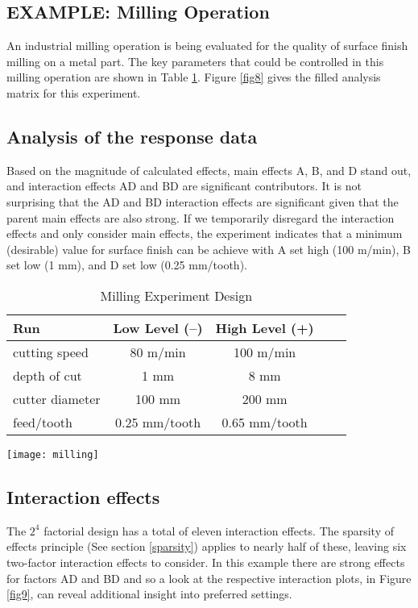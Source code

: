\subsection{EXAMPLE: Milling Operation}
An industrial milling operation is being evaluated for the quality of surface finish milling on a metal part.  The key parameters that could be controlled in this milling operation are shown in Table \ref{tab8}. Figure \ref{fig8} gives the filled analysis matrix for this experiment.

\subsection{Analysis of the response data}
Based on the magnitude of calculated effects, main effects A, B, and D stand out, and interaction effects AD and BD are significant contributors.  It is not surprising that the AD and BD interaction effects are significant given that the parent main effects are also strong. If we temporarily disregard the interaction effects and only consider main effects, the experiment indicates that a minimum (desirable) value for surface finish can be achieve with A set high (100 m/min), B set low (1 mm), and D set low (0.25 mm/tooth).\label{maineff}

\begin{table}[h]\caption{Milling Experiment Design}\label{tab8}
\begin{center}
\begin{tabular}{|l|c|c|c|c|}
\hline Run & Low Level (--) & High Level (+)  \\ 
\hline cutting speed & 80 m/min & 100 m/min  \\
\hline depth of cut & 1 mm & 8 mm \\
\hline cutter diameter & 100 mm & 200 mm\\
\hline feed/tooth & 0.25 mm/tooth & 0.65 mm/tooth \\
\hline
\end{tabular} 
\end{center}
\end{table}

\begin{sidewaysfigure}[h]\caption{Milling Experiment Analysis Matrix}\label{fig8}
\begin{center}
\texttt{[image: milling]}
\end{center}
\end{sidewaysfigure}

\subsection{Interaction effects}
The $2^{4}$ factorial design has a total of eleven interaction effects.  The sparsity of effects principle (See section \ref{sparsity}) applies to nearly half of these, leaving six two-factor interaction effects to consider.  In this example there are strong effects for factors AD and BD and so a look at the respective interaction plots, in Figure \ref{fig9}, can reveal additional insight into preferred settings.

